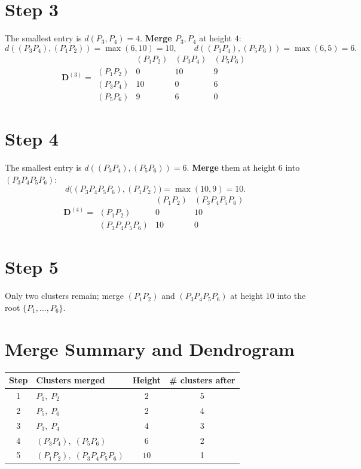\documentclass[11pt,a4paper]{report}
\theoremstyle{definition}
\theoremstyle{plain}
\theoremstyle{remark}
\begin{document}
\section{Step 3}
The smallest entry is $d(P_3,P_4)=4$. \textbf{Merge $P_3,P_4$} at height $4$:
\[
d((P_3P_4),(P_1P_2))=\max(6,10)=10,\qquad d((P_3P_4),(P_5P_6))=\max(6,5)=6.
\]
\begin{equation}
\mathbf{D}^{(3)}=
\begin{array}{c|ccc}
        & (P_1P_2) & (P_3P_4) & (P_5P_6)\\ \hline
(P_1P_2)  & 0  & 10 & 9\\
(P_3P_4)  & 10 & 0  & 6\\
(P_5P_6)  & 9  & 6  & 0
\end{array}
\end{equation}

\section{Step 4}
The smallest entry is $d((P_3P_4),(P_5P_6))=6$. \textbf{Merge} them at height $6$
into $(P_3P_4P_5P_6)$:
\[
d\bigl((P_3P_4P_5P_6),(P_1P_2)\bigr)=\max(10,9)=10.
\]
\begin{equation}
\mathbf{D}^{(4)}=
\begin{array}{c|cc}
             & (P_1P_2) & (P_3P_4P_5P_6)\\ \hline
(P_1P_2)       & 0  & 10\\
(P_3P_4P_5P_6) & 10 & 0
\end{array}
\end{equation}

\section{Step 5}
Only two clusters remain; merge $(P_1P_2)$ and $(P_3P_4P_5P_6)$ at height $10$
into the root $\{P_1,\dots,P_6\}$.

\section{Merge Summary and Dendrogram}
\begin{center}
\begin{tabular}{@{}clcc@{}}
\toprule
Step & Clusters merged & Height & \# clusters after\\
\midrule
1 & $P_1,\;P_2$              & $2$  & 5\\
2 & $P_5,\;P_6$              & $2$  & 4\\
3 & $P_3,\;P_4$              & $4$  & 3\\
4 & $(P_3P_4),\;(P_5P_6)$    & $6$  & 2\\
5 & $(P_1P_2),\;(P_3P_4P_5P_6)$ & $10$ & 1\\
\bottomrule
\end{tabular}
\end{center}
\end{document}
